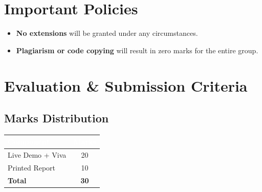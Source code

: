 \documentclass[12pt, a4paper]{article}
\begin{document}
\section{Important Policies}

\begin{itemize}[leftmargin=1.5em, itemsep=0.3em]
    \item \textbf{No extensions} will be granted under any circumstances.
    \item \textbf{Plagiarism or code copying} will result in zero marks for the entire group.
\end{itemize}

\section{Evaluation \& Submission Criteria}

\subsection*{Marks Distribution}

\begin{table}[ht]
\centering
\begin{tabular}{lc}
\toprule
\rowcolor{headerblue}
\textcolor{white}{\textbf{Component}} & \textcolor{white}{\textbf{Marks}} \\
\midrule
Live Demo + Viva  & 20 \\
\rowcolor{rowgray}
Printed Report    & 10 \\
\midrule
\textbf{Total}    & \textbf{30} \\
\bottomrule
\end{tabular}
\end{table}
\end{document}
